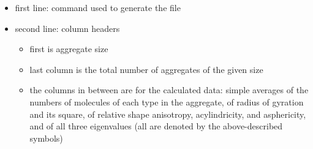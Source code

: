 \begin{enumerate}[nosep,leftmargin=20pt]
\begin{itemize}[nosep,leftmargin=5pt]
    \item first line: command used to generate the file
    \item second line: column headers
      \begin{itemize}[nosep,leftmargin=10pt]
        \item first is aggregate size
        \item last column is the total number of aggregates of the given size
        \item the columns in between are for the calculated data: simple
          averages of the numbers of molecules of each type in the
          aggregate, of radius of gyration and its square, of relative
          shape anisotropy, acylindricity, and asphericity, and of all
          three eigenvalues (all are denoted by the above-described symbols)
      \end{itemize}
  \end{itemize}
\end{enumerate}

